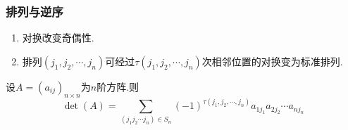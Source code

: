\begin{frame}\frametitle{排列与逆序}
\begin{lemma}
\begin{enumerate}
\item 对换改变奇偶性.\pp
\item 排列$(j_1,j_2,\cdots,j_n)$可经过$\tau(j_1,j_2,\cdots,j_n)$次相邻位置的对换变为标准排列.
\end{enumerate}
\end{lemma}
\pp
\begin{theorem}[行列式显示表示]
设$A=(a_{ij})_{n\times n}$为$n$阶方阵.则
\begin{equation*}
\det(A) = \sum_{(j_1j_2\cdots j_n)\in S_n}(-1)^{\tau(j_1,j_2,\cdots,j_n)} a_{1j_1}a_{2j_2}\cdots a_{nj_n}
\end{equation*}
\end{theorem}
\end{frame}





